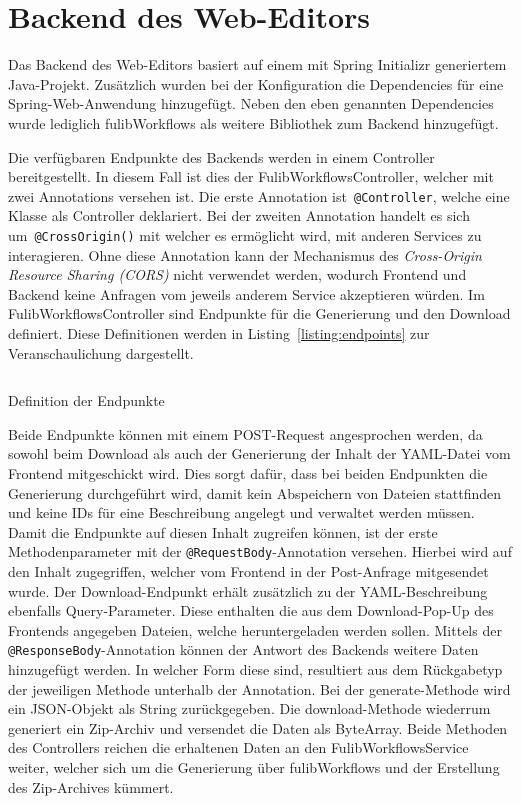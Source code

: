 \section{Backend des Web-Editors}\label{sec:editor-backend}
Das Backend des Web-Editors basiert auf einem mit Spring Initializr generiertem Java-Projekt.
Zusätzlich wurden bei der Konfiguration die Dependencies für eine Spring-Web-Anwendung hinzugefügt.
Neben den eben genannten Dependencies wurde lediglich fulibWorkflows als weitere Bibliothek zum Backend hinzugefügt.

Die verfügbaren Endpunkte des Backends werden in einem Controller bereitgestellt.
In diesem Fall ist dies der FulibWorkflowsController, welcher mit zwei Annotations versehen ist.
Die erste Annotation ist~\texttt{@Controller}, welche eine Klasse als Controller deklariert.
Bei der zweiten Annotation handelt es sich um~\texttt{@CrossOrigin()} mit welcher es ermöglicht wird, mit anderen Services zu interagieren.
Ohne diese Annotation kann der Mechanismus des \textit{Cross-Origin Resource Sharing (CORS)} nicht verwendet werden, wodurch Frontend und Backend
keine Anfragen vom jeweils anderem Service akzeptieren würden.
Im FulibWorkflowsController sind Endpunkte für die Generierung und den Download definiert.
Diese Definitionen werden in Listing~\ref{listing:endpoints} zur Veranschaulichung dargestellt.

\begin{listing}[!ht]
    \inputminted[firstnumber=15]{java}{listings/3.3/Endpoints.java}
    \caption{Definition der Endpunkte}
    \label{listing:endpoints}
\end{listing}

Beide Endpunkte können mit einem POST-Request angesprochen werden, da sowohl beim Download als auch der Generierung der Inhalt der
YAML-Datei vom Frontend mitgeschickt wird.
Dies sorgt dafür, dass bei beiden Endpunkten die Generierung durchgeführt wird, damit kein Abspeichern von Dateien stattfinden und keine IDs für
eine Beschreibung angelegt und verwaltet werden müssen.
Damit die Endpunkte auf diesen Inhalt zugreifen können, ist der erste Methodenparameter mit der \texttt{@RequestBody}-Annotation versehen.
Hierbei wird auf den Inhalt zugegriffen, welcher vom Frontend in der Post-Anfrage mitgesendet wurde.
Der Download-Endpunkt erhält zusätzlich zu der YAML-Beschreibung ebenfalls Query-Parameter.
Diese enthalten die aus dem Download-Pop-Up des Frontends angegeben Dateien, welche heruntergeladen werden sollen.
Mittels der \texttt{@ResponseBody}-Annotation können der Antwort des Backends weitere Daten hinzugefügt werden.
In welcher Form diese sind, resultiert aus dem Rückgabetyp der jeweiligen Methode unterhalb der Annotation.
Bei der generate-Methode wird ein JSON-Objekt als String zurückgegeben.
Die download-Methode wiederrum generiert ein Zip-Archiv und versendet die Daten als ByteArray.
Beide Methoden des Controllers reichen die erhaltenen Daten an den FulibWorkflowsService weiter, welcher sich um die Generierung über fulibWorkflows
und der Erstellung des Zip-Archives kümmert.


